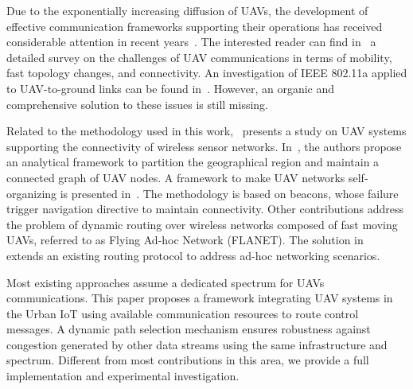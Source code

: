 Due to the exponentially increasing diffusion of UAVs, the development of effective communication frameworks supporting their operations has received considerable attention in recent years~\cite{bekmezci2013flying}. The interested reader can find in~\cite{gupta2016survey} a detailed survey on the challenges of UAV communications in terms of mobility, fast topology changes, and connectivity. An investigation of IEEE 802.11a applied to UAV-to-ground links can be found in~\cite{yanmaz2011channel}. However, an organic and comprehensive solution to these issues is still missing. 

Related to the methodology used in this work,~\cite{de2010uav} presents a study on UAV systems supporting the connectivity of wireless sensor networks. In~\cite{ha2010uav}, the authors propose an analytical framework to partition the geographical region and maintain a connected graph of UAV nodes. A framework to make UAV networks self-organizing is presented in~\cite{orfanus2016self}. The methodology is based on beacons, whose failure trigger navigation directive to maintain connectivity. Other contributions address the problem of dynamic routing over wireless networks composed of fast moving UAVs, referred to as Flying Ad-hoc Network (FLANET). The solution in~\cite{rosati2016dynamic} extends an existing routing protocol to address ad-hoc networking scenarios.

Most existing approaches assume a dedicated spectrum for UAVs communications.
This paper proposes a framework integrating UAV systems in the Urban IoT using available communication resources to route control messages. A dynamic path selection mechanism ensures robustness against congestion generated by other data streams using the same infrastructure and spectrum. Different from most contributions in this area, we provide a full implementation and experimental investigation.
